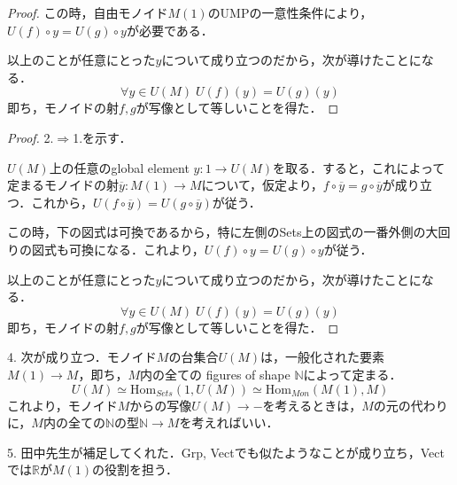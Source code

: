 \documentclass[uplatex, 12pt, dvipdfmx]{jsarticle}
\begin{document}
\begin{example}
\begin{proof}
        この時，自由モノイド$M(1)$のUMPの一意性条件により，$U(f)\circ y=U(g)\circ y$が必要である．

        以上のことが任意にとった$y$について成り立つのだから，次が導けたことになる．
        \[\forall y\in U(M)\; U(f)(y)=U(g)(y) \]
        即ち，モノイドの射$f,g$が写像として等しいことを得た．
    \end{proof}
    \begin{proof}
        2.$\Rightarrow$1.を示す．
        
        $U(M)$上の任意のglobal element $y:1\to U(M)$を取る．すると，これによって定まるモノイドの射$\overline{y}:M(1)\to M$について，仮定より，$f\circ \overline{y}=g\circ\overline{y}$が成り立つ．これから，$U(f\circ\overline{y})=U(g\circ\overline{y})$が従う．
        
        この時，下の図式は可換であるから，特に左側のSets上の図式の一番外側の大回りの図式も可換になる．これより，$U(f)\circ y=U(g)\circ y$が従う．
        \begin{center}
        \end{center}

        以上のことが任意にとった$y$について成り立つのだから，次が導けたことになる．
        \[\forall y\in U(M)\; U(f)(y)=U(g)(y) \]
        即ち，モノイドの射$f,g$が写像として等しいことを得た．
    \end{proof}

    4. 次が成り立つ．モノイド$M$の台集合$U(M)$は，一般化された要素$M(1)\to M$，即ち，$M$内の全ての figures of shape $\mathbb{N}$によって定まる．
    \[ U(M)\simeq \mathrm{Hom}_{Sets}(1,U(M))\simeq \mathrm{Hom}_{Mon}(M(1),M) \]
    これより，モノイド$M$からの写像$U(M)\to -$を考えるときは，$M$の元の代わりに，$M$内の全ての$\mathbb{N}$の型$\mathbb{N}\to M$を考えればいい．

    5. 田中先生が補足してくれた．Grp, Vectでも似たようなことが成り立ち，Vectでは$\mathbb{R}$が$M(1)$の役割を担う．
\end{example}
\end{document}
